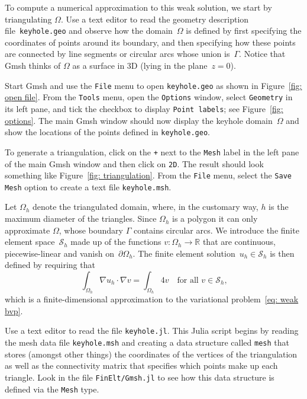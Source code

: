 \documentclass[a4paper,12pt]{article}
\begin{document}
To compute a numerical approximation to this weak solution, we start 
by triangulating $\Omega$.  Use a text editor to read the 
geometry description file~\verb!keyhole.geo! and observe how the 
domain~$\Omega$ is defined by first specifying the coordinates of 
points around its boundary, and then specifying how these points are 
connected by line segments or circular arcs whose union is~$\Gamma$.  
Notice that Gmsh thinks of $\Omega$ as a surface in 3D (lying in the 
plane~$z=0$).

Start Gmsh and use the \verb!File! menu to open 
\verb!keyhole.geo! as shown in Figure~\ref{fig: open file}.  
From the \verb!Tools! menu, open the \verb!Options! window, select 
\verb!Geometry! in its left pane, and tick the checkbox to display 
\verb!Point labels!; see Figure~\ref{fig: options}.  The main Gmsh 
window should now display the keyhole domain~$\Omega$ and show the 
locations of the points defined in \verb!keyhole.geo!.

To generate a triangulation, click on the \verb!+! next to 
the \verb!Mesh! label in the left pane of the main Gmsh window and 
then click on \verb!2D!.  The result should look something like 
Figure~\ref{fig: triangulation}.  From the \verb!File! menu, select 
the \verb!Save Mesh! option to create a text file 
\verb!keyhole.msh!.

Let $\Omega_h$ denote the triangulated domain, where, in the customary
way, $h$ is the maximum diameter of the triangles.  Since $\Omega_h$ 
is a polygon it can only approximate $\Omega$, whose boundary 
$\Gamma$ contains circular arcs.  We introduce the finite element 
space~$\mathcal{S}_h$ made up of the functions 
$v:\Omega_h\to\mathbb{R}$ that are continuous, piecewise-linear and 
vanish on~$\partial\Omega_h$.  The finite element 
solution~$u_h\in\mathcal{S}_h$ is then defined by requiring that
\begin{equation}\label{eq: finite elt problem}
\int_{\Omega_h}\nabla u_h\cdot\nabla v=\int_{\Omega_h} 4v
	\quad\text{for all $v\in\mathcal{S}_h$,}
\end{equation}
which is a finite-dimensional approximation to the variational 
problem~\eqref{eq: weak bvp}.

Use a text editor to read the file \verb!keyhole.jl!.  This 
Julia script begins by reading the mesh data file \verb!keyhole.msh! 
and creating a data structure called \verb!mesh! that stores (amongst 
other things) the coordinates of the vertices of the triangulation as 
well as the connectivity matrix that specifies which points make up 
each triangle.  Look in the file
\verb!FinElt/Gmsh.jl! to see how this data structure is defined via 
the \verb!Mesh! type.  
\end{document}
